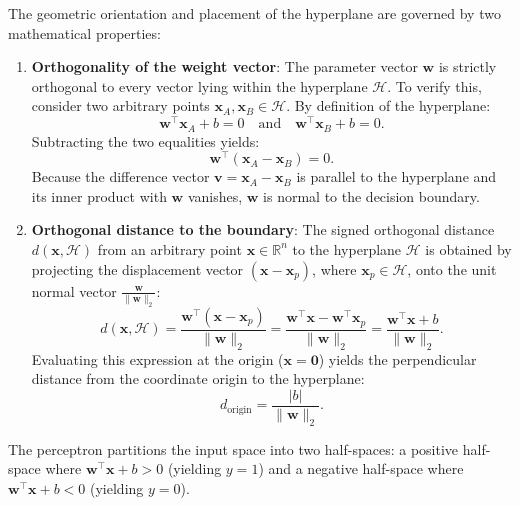\documentclass[../../main.tex]{subfiles}
\begin{document}
The geometric orientation and placement of the hyperplane are governed by two mathematical properties:
\begin{enumerate}[label=(\roman*)]
    \item \textbf{Orthogonality of the weight vector}: The parameter vector $\mathbf{w}$ is strictly orthogonal to every vector lying within the hyperplane $\mathcal{H}$. To verify this, consider two arbitrary points $\mathbf{x}_A, \mathbf{x}_B \in \mathcal{H}$. By definition of the hyperplane:
    \begin{equation}
    \mathbf{w}^\top \mathbf{x}_A + b = 0 \quad \text{and} \quad \mathbf{w}^\top \mathbf{x}_B + b = 0.
    \end{equation}
    Subtracting the two equalities yields:
    \begin{equation}
    \mathbf{w}^\top \left(\mathbf{x}_A - \mathbf{x}_B\right) = 0.
    \end{equation}
    Because the difference vector $\mathbf{v} = \mathbf{x}_A - \mathbf{x}_B$ is parallel to the hyperplane and its inner product with $\mathbf{w}$ vanishes, $\mathbf{w}$ is normal to the decision boundary.
    \item \textbf{Orthogonal distance to the boundary}: The signed orthogonal distance $d(\mathbf{x}, \mathcal{H})$ from an arbitrary point $\mathbf{x} \in \mathbb{R}^n$ to the hyperplane $\mathcal{H}$ is obtained by projecting the displacement vector $(\mathbf{x} - \mathbf{x}_p)$, where $\mathbf{x}_p \in \mathcal{H}$, onto the unit normal vector $\frac{\mathbf{w}}{\|\mathbf{w}\|_2}$:
    \begin{equation}
    d(\mathbf{x}, \mathcal{H}) = \frac{\mathbf{w}^\top (\mathbf{x} - \mathbf{x}_p)}{\|\mathbf{w}\|_2} = \frac{\mathbf{w}^\top \mathbf{x} - \mathbf{w}^\top \mathbf{x}_p}{\|\mathbf{w}\|_2} = \frac{\mathbf{w}^\top \mathbf{x} + b}{\|\mathbf{w}\|_2}.
    \end{equation}
    Evaluating this expression at the origin ($\mathbf{x} = \mathbf{0}$) yields the perpendicular distance from the coordinate origin to the hyperplane:
    \begin{equation}
    d_{\text{origin}} = \frac{|b|}{\|\mathbf{w}\|_2}.
    \end{equation}
\end{enumerate}
The perceptron partitions the input space into two half-spaces: a positive half-space where $\mathbf{w}^\top \mathbf{x} + b > 0$ (yielding $y = 1$) and a negative half-space where $\mathbf{w}^\top \mathbf{x} + b < 0$ (yielding $y = 0$).
\end{document}
